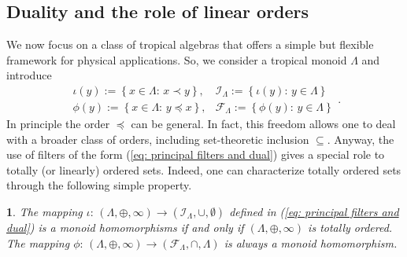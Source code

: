\documentclass[11pt,british,reqno]{article}
\numberwithin{equation}{section}
\numberwithin{figure}{section}
\numberwithin{table}{section}
\theoremstyle{definition}
\theoremstyle{definition}
\theoremstyle{plain}
\theoremstyle{plain}
\newtheorem{proposition}{\protect\propositionname}
\theoremstyle{remark}
\theoremstyle{plain}
\numberwithin{equation}{section}
\numberwithin{figure}{section}
\numberwithin{table}{section}
\theoremstyle{plain}
\providecommand{\propositionname}{Proposition}
\begin{document}
\subsection{\label{subsec: Duality and the role of linear orders} Duality and the role of linear orders}

We now focus on a class of tropical algebras that offers a simple but
flexible framework for physical applications. So, we consider a
tropical monoid $\Lambda$ and introduce 
\begin{equation}
\begin{array}{cc}
\mathcal{\iota}(y):=\left\{ x\in\Lambda:\,x\prec y\right\} , & \mathcal{I}_{\Lambda}:=\left\{ \mathcal{\iota}(y):\,y\in\Lambda\right\} \\
\phi(y):=\left\{ x\in\Lambda:\,y\preceq x\right\} , & \mathcal{F}_{\Lambda}:=\left\{ \phi(y):\,y\in\Lambda\right\} 
\end{array}.\label{eq: principal filters and dual}
\end{equation}
In principle the order $\preceq$ can be general. In fact, this freedom
allows one to deal with a broader class of orders, including set-theoretic
inclusion $\subseteq$. Anyway, the use of filters of the form (\ref{eq: principal filters and dual}) gives a special role to totally (or linearly) ordered sets. Indeed, one can characterize totally ordered sets through the following simple property. 
\begin{proposition}
\label{prop: homomorphism and linear order} The mapping $\iota:\,(\Lambda,\oplus,\infty)\longrightarrow(\mathcal{I}_{\Lambda},\cup,\emptyset)$
defined in (\ref{eq: principal filters and dual}) is a monoid homomorphisms
if and only if $(\Lambda,\oplus,\infty)$ is totally ordered. The
mapping $\phi:\,(\Lambda,\oplus,\infty)\longrightarrow(\mathcal{F}_{\Lambda},\cap,\Lambda)$
is always a monoid homomorphism.
\end{proposition}
\end{document}
